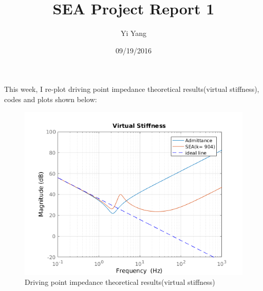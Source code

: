 \documentclass[letterpaper]{article}
\author{Yi Yang}
\title{SEA Project Report 1}
\begin{document}
\date{09/19/2016}
\maketitle

\newcommand{\trace}{\mathrm{trace}}
\newcommand{\real}{\mathbb R}  %
\newcommand{\nat}{\mathbb N}   %
\newcommand{\cp}{\mathbb C}    %
\newcommand{\ds}{\displaystyle}
\newcommand{\mf}[2]{\frac{\ds #1}{\ds #2}}
\newcommand{\spanof}[1]{\textrm{span} \{ #1 \}}
\newcommand{\sol}[0]{\textbf{Solution: }}
\newcommand{\pf}[0]{\textbf{Proof:}}
\newcommand{\rme}[0]{\textrm{e}}
\newcommand{\Null}[1]{\textrm{Null}\{#1\}}
\parindent 0pt
This week, I re-plot driving point impedance theoretical results(virtual stiffness), codes and plots shown below:

\begin{figure}[H]
	\centering
	\includegraphics[scale=0.8]{theoretical.png}
	\caption{Driving point impedance theoretical results(virtual stiffness)}
	\label{fig:theo}
\end{figure}
\end{document}
